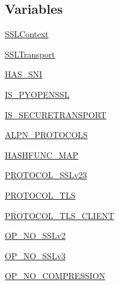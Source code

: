 \subsection*{Variables}
\begin{DoxyCompactItemize}
\item 
\hyperlink{namespacepip_1_1__vendor_1_1urllib3_1_1util_1_1ssl___aab52d44fc25f734a0f35c1dc9c38b6ec}{S\+S\+L\+Context}
\item 
\hyperlink{namespacepip_1_1__vendor_1_1urllib3_1_1util_1_1ssl___a52448a176dbb83595ed17776cc71376f}{S\+S\+L\+Transport}
\item 
\hyperlink{namespacepip_1_1__vendor_1_1urllib3_1_1util_1_1ssl___a64f59d8a7a2bd71e5b9886471117852a}{H\+A\+S\+\_\+\+S\+NI}
\item 
\hyperlink{namespacepip_1_1__vendor_1_1urllib3_1_1util_1_1ssl___a00c1f95d650805bce796335c8483e5e6}{I\+S\+\_\+\+P\+Y\+O\+P\+E\+N\+S\+SL}
\item 
\hyperlink{namespacepip_1_1__vendor_1_1urllib3_1_1util_1_1ssl___a720e1ac7540424c0294bc6ed087be952}{I\+S\+\_\+\+S\+E\+C\+U\+R\+E\+T\+R\+A\+N\+S\+P\+O\+RT}
\item 
\hyperlink{namespacepip_1_1__vendor_1_1urllib3_1_1util_1_1ssl___af198ce2fb04de3f7ccc35f0960ce1319}{A\+L\+P\+N\+\_\+\+P\+R\+O\+T\+O\+C\+O\+LS}
\item 
\hyperlink{namespacepip_1_1__vendor_1_1urllib3_1_1util_1_1ssl___a0e6ef037847dba0a0b74447f69d3ee6f}{H\+A\+S\+H\+F\+U\+N\+C\+\_\+\+M\+AP}
\item 
\hyperlink{namespacepip_1_1__vendor_1_1urllib3_1_1util_1_1ssl___a2064399eb71d1880ddf860e98a717a32}{P\+R\+O\+T\+O\+C\+O\+L\+\_\+\+S\+S\+Lv23}
\item 
\hyperlink{namespacepip_1_1__vendor_1_1urllib3_1_1util_1_1ssl___a9e77444769af6189be2498cbd6fcdd2d}{P\+R\+O\+T\+O\+C\+O\+L\+\_\+\+T\+LS}
\item 
\hyperlink{namespacepip_1_1__vendor_1_1urllib3_1_1util_1_1ssl___aae687e3e9b805942f48f91448d5c0b0b}{P\+R\+O\+T\+O\+C\+O\+L\+\_\+\+T\+L\+S\+\_\+\+C\+L\+I\+E\+NT}
\item 
\hyperlink{namespacepip_1_1__vendor_1_1urllib3_1_1util_1_1ssl___ab00aac4a367249a17c54810fe88389d7}{O\+P\+\_\+\+N\+O\+\_\+\+S\+S\+Lv2}
\item 
\hyperlink{namespacepip_1_1__vendor_1_1urllib3_1_1util_1_1ssl___a2f15c74c824230cfca0f27b83a5eb9c9}{O\+P\+\_\+\+N\+O\+\_\+\+S\+S\+Lv3}
\item 
\hyperlink{namespacepip_1_1__vendor_1_1urllib3_1_1util_1_1ssl___a01649cfe84c8a20f2261e595d12e104f}{O\+P\+\_\+\+N\+O\+\_\+\+C\+O\+M\+P\+R\+E\+S\+S\+I\+ON}

\end{DoxyCompactItemize}
